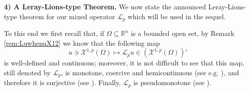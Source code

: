 \documentclass[11pt,a4paper]{amsart}
\def \LL {\mathcal{L}}
\theoremstyle{definition}
\theoremstyle{plain}
\numberwithin{equation}{section}
\begin{document}
{  \noindent\textbf{4)  A Leray-Lions-type Theorem.}
 We now state the announced Leray-Lions-ty\-pe theorem for our mixed operator $\mathcal{L}_p$
 which will be used in the sequel.
  \vspace{0.1cm}
  
  To this end we first recall that, 
  if $\Omega\subseteq\mathbb{R}^n$ is a bounded
  open set, by Remark \ref{rem:LuwhenuX12}
  we know that
  the following map
  $$u\ni \mathcal{X}^{1,p}(\Omega)\mapsto \mathcal{L}_pu\in(\mathcal{X}^{1,p}(\Omega))'$$
  is well-defined and continuous; moreover, it is not difficult to see that
  this map, still denoted by $\LL_p$, is monotone, coercive and hemicontinuous (see e.g. \cite[Section 3]{GarainLindgren}), and therefore it is surjective (see \cite[Corollary 2.2]{Showalter}). Finally, $\mathcal{L}_p$ is pseudomonotone (see \cite[Proposition 2.3]{Showalter}).
\medskip

}
\end{document}

